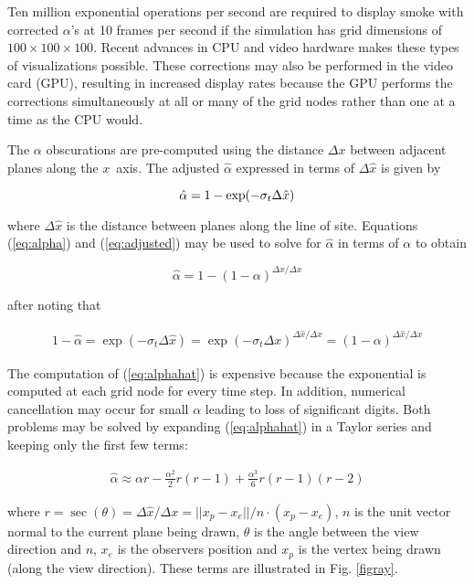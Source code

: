 {Ten million exponential operations per second are required to
display smoke with corrected $\alpha$'s at 10 frames per second if
the simulation has grid dimensions of $100\times 100\times 100$.
Recent advances in CPU and video hardware makes these types of
visualizations possible. These corrections may also be performed
in the video card (GPU), resulting in increased display rates
because the GPU performs the corrections simultaneously at all or
many of the grid nodes rather than one at a time as the CPU would.

The $\alpha$ obscurations are pre-computed using the distance
$\Delta x$ between adjacent planes along the $x$~axis. The
adjusted $\hat{\alpha}$ expressed in terms of $\Delta\hat{x}$ is
given by

\begin{equation}
\label{eq:adjusted}
\hat{\alpha}=1-\exp(-\sigma_t\Delta \hat{x})\\
\end{equation}

where $\Delta\hat{x}$ is the distance between planes along the
line of site.  Equations (\ref{eq:alpha}) and (\ref{eq:adjusted})
may be used to solve for $\hat{\alpha}$ in terms of $\alpha$ to
obtain

\begin{equation}
\label{eq:alphahat}
\hat{\alpha}=1-(1-\alpha)^{\Delta\hat{x}/\Delta x}
\end{equation}

after noting that

\begin{eqnarray}
1-\hat{\alpha}=\exp(-\sigma_t\Delta\hat{x})=\exp(-\sigma_t\Delta
x)^{\Delta\hat{x}/\Delta x}=(1-\alpha)^{\Delta\hat{x}/\Delta x}
\end{eqnarray}

The computation of (\ref{eq:alphahat}) is expensive because the
exponential is computed at each grid node for every time step.  In
addition, numerical cancellation may occur for small $\alpha$
leading to loss of significant digits. Both problems may be solved
by expanding (\ref{eq:alphahat}) in a Taylor series and keeping
only the first few terms:

\begin{eqnarray}
\hat{\alpha}\approx \alpha r -
\frac{\alpha^2}{2}r(r-1)+\frac{\alpha^3}{6}r(r-1)(r-2)
\end{eqnarray}

where $r=\sec(\theta)=\Delta \hat{x}/\Delta
x=||x_p-x_e||/n\cdot(x_p-x_e)$, $n$ is the unit vector normal to
the current plane being drawn, $\theta$ is the angle between the
view direction and $n$, $x_e$ is the observers position and $x_p$
is the vertex being drawn (along the view direction).  These terms
are illustrated in Fig. \ref{figray}.

}
